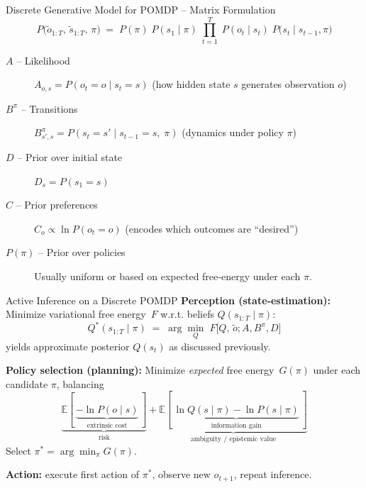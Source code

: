 \documentclass[aspectratio=1610, english]{beamer}
\begin{document}
\begin{frame}{Discrete Generative Model for POMDP -- Matrix Formulation}
\[
  P\bigl(\tilde o_{1:T},\,\tilde s_{1:T},\,\pi\bigr)
    \;=\;P(\pi)\;P(s_1\mid\pi)\;\prod_{t=1}^T
       \;P(o_t\mid s_t)\;P\bigl(s_t\mid s_{t-1},\pi\bigr)
\]
\medskip

\begin{description}
  \item[\(A\) – Likelihood]  
    \(A_{o,s} = P(o_t = o\mid s_t = s)\)  
    (how hidden state \(s\) generates observation \(o\))
  \item[\(B^\pi\) – Transitions]  
    \(B^\pi_{s',s} = P(s_t = s'\mid s_{t-1} = s,\;\pi)\)  
    (dynamics under policy \(\pi\))
  \item[\(D\) – Prior over initial state]  
    \(D_{s} = P(s_1 = s)\)
  \item[\(C\) – Prior preferences]  
    \(C_{o}\propto \ln P(o_t = o)\)  
    (encodes which outcomes are “desired”)
  \item[\(P(\pi)\) – Prior over policies]  
    Usually uniform or based on expected free‐energy under each \(\pi\). \cite{active-inference-tutorial}
\end{description}
\end{frame}

\begin{frame}{Active Inference on a Discrete POMDP}
\textbf{Perception (state‑estimation):}  
Minimize variational free energy \(F\) w.r.t. beliefs \(Q(s_{1:T}\!\mid\!\pi)\):
\[
  Q^*(s_{1:T}\!\mid\!\pi)
  \;=\;\arg\min_{Q}\;F\bigl[Q,\,\tilde o;A,B^\pi,D\bigr]
\]
yields approximate posterior \(Q(s_t)\) as discussed previously.

\medskip
\textbf{Policy selection (planning):}  
Minimize \emph{expected} free energy \(G(\pi)\) under each candidate \(\pi\),
balancing
\[
  \underbrace{\mathbb{E}[\,\underbrace{-\ln P(o\mid s)}_{\text{extrinsic cost}}\,]}_{\text{risk}}
  + 
  \underbrace{\mathbb{E}[\,\underbrace{\ln Q(s\mid\pi) - \ln P(s\mid\pi)}_{\text{information gain}}\,]}_{\text{ambiguity / epistemic value}}
\]
Select  
\(\displaystyle \pi^* = \arg\min_\pi G(\pi)\).

\medskip
\textbf{Action:} execute first action of \(\pi^*\), observe new \(o_{t+1}\), repeat inference.
\end{frame}
\end{document}
